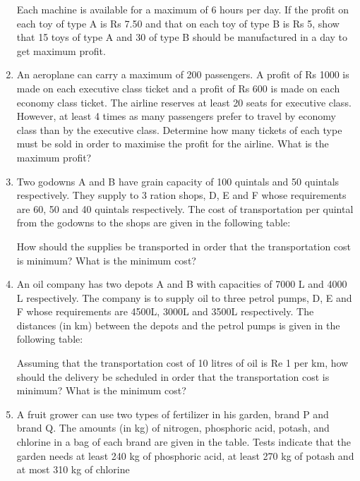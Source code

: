 \documentclass[journal,12pt,twocolumn]{IEEEtran}
\begin{document}
\begin{enumerate}
\begin{table}[h]
\centering

\caption{}
\end{table}

Each machine is available for a maximum of 6 hours per day. If the profit on each toy of type A is Rs 7.50 and that on each toy of type B is Rs 5, show that 15 toys of type A and 30 of type B should be manufactured in a day to get maximum profit.

\item An aeroplane can carry a maximum of 200 passengers. A profit of Rs 1000 is made on each executive class ticket and a profit of Rs 600 is made on each
economy class ticket. The airline reserves at least 20 seats for executive class. However, at least 4 times as many passengers prefer to travel by economy class than by the executive class. Determine how many tickets of each type must be sold in order to maximise the profit for the airline. What is the maximum profit?

\item Two godowns A and B have grain capacity of 100 quintals and 50 quintals respectively. They supply to 3 ration shops, D, E and F whose requirements are 60, 50 and 40 quintals respectively. The cost of transportation per quintal from the godowns to the shops are given in the following table:

\begin{table}[h]
\centering

\caption{}
\end{table}

How should the supplies be transported in order that the transportation cost is minimum? What is the minimum cost?

\item An oil company has two depots A and B with capacities of 7000 L and 4000 L respectively. The company is to supply oil to three petrol pumps, D, E and F whose requirements are 4500L, 3000L and 3500L respectively. The distances (in km) between the depots and the petrol pumps is given in the following table:

\begin{table}[h]
\centering

\caption{}
\end{table}

Assuming that the transportation cost of 10 litres of oil is Re 1 per km, how should the delivery be scheduled in order that the transportation cost is minimum? What is the minimum cost?

\item A fruit grower can use two types of fertilizer in his garden, brand P and brand Q. The amounts (in kg) of nitrogen, phosphoric acid, potash, and chlorine in a bag of each brand are given in the table. Tests indicate that the garden needs at least 240 kg of phosphoric acid, at least 270 kg of potash and at most 310 kg of chlorine


\end{enumerate}
\end{document}
